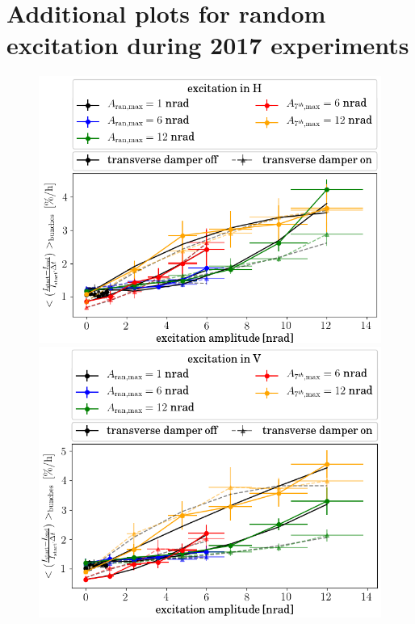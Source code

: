 \documentclass[%
 reprint,
 amsmath,amssymb,
 aps,
prstab,
]{revtex4-1}
\begin{document}
\section{Additional plots for random excitation during 2017 experiments}
\label{app:sec:ran}
\begin{figure}[h]
	\begin{minipage}[t]{0.49\linewidth}
		\centering
		\includegraphics[width=1.0\linewidth]{2017_scale_amp_ranh_lbllong.png}
	\end{minipage}	
	\begin{minipage}[t]{0.49\linewidth}
		\centering
		\includegraphics[width=1.0\linewidth]{2017_scale_amp_ranv_lbllong.png}

\end{minipage}
\end{figure}
\end{document}
